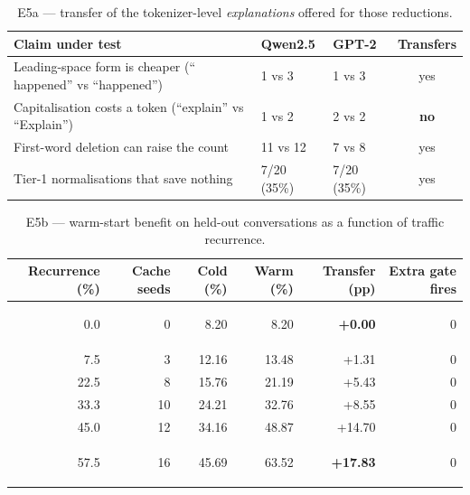 \documentclass[11pt,a4paper]{article}
\newcommand{\hl}[1]{\colorbox{hlyellow}{\strut #1}}
\begin{document}
\begin{table}[htbp]
\centering
\caption{E5a --- transfer of the tokenizer-level \emph{explanations} offered for
those reductions.}
\label{tab:claims}
\footnotesize
\begin{tabularx}{\textwidth}{@{}X l l c@{}}
\toprule
\textbf{Claim under test} & \textbf{Qwen2.5} & \textbf{GPT-2} & \textbf{Transfers} \\
\midrule
Leading-space form is cheaper (`` happened'' vs ``happened'') & 1 vs 3 & 1 vs 3 & yes \\
Capitalisation costs a token (``explain'' vs ``Explain'')     & 1 vs 2 & 2 vs 2 & \textbf{no} \\
First-word deletion can raise the count                        & 11 vs 12 & 7 vs 8 & yes \\
Tier-1 normalisations that save nothing                        & 7/20 (35\%) & 7/20 (35\%) & yes \\
\bottomrule
\end{tabularx}
\end{table}

\begin{table}[htbp]
\centering
\caption{E5b --- warm-start benefit on held-out conversations as a function of
traffic recurrence.}
\label{tab:learning}
\footnotesize
\begin{tabular}{@{}r r rr r r@{}}
\toprule
\textbf{Recurrence (\%)} & \textbf{Cache seeds} & \textbf{Cold (\%)} &
\textbf{Warm (\%)} & \textbf{Transfer (pp)} & \textbf{Extra gate fires} \\
\midrule
0.0  & 0  & 8.20  & 8.20  & \hl{\textbf{+0.00}} & 0 \\
7.5  & 3  & 12.16 & 13.48 & +1.31  & 0 \\
22.5 & 8  & 15.76 & 21.19 & +5.43  & 0 \\
33.3 & 10 & 24.21 & 32.76 & +8.55  & 0 \\
45.0 & 12 & 34.16 & 48.87 & +14.70 & 0 \\
57.5 & 16 & 45.69 & 63.52 & \hl{\textbf{+17.83}} & 0 \\
\bottomrule
\end{tabular}
\end{table}
\end{document}

